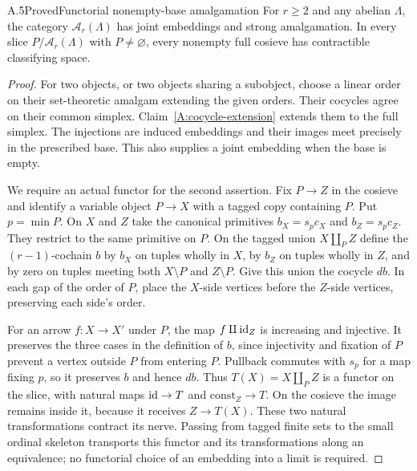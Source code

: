 \begin{claim}{A.5}{Proved}{Functorial nonempty-base amalgamation}\label{A:cocycle-amalgam}
For $r\geq2$ and any abelian $\Lambda$, the category $\mathcal A_r(\Lambda)$ has joint embeddings and strong amalgamation. In every slice $P/\mathcal A_r(\Lambda)$ with $P\ne\varnothing$, every nonempty full cosieve has contractible classifying space.
\end{claim}
\begin{proof}
For two objects, or two objects sharing a subobject, choose a linear order on their set-theoretic amalgam extending the given orders. Their cocycles agree on their common simplex. Claim~\ref{A:cocycle-extension} extends them to the full simplex. The injections are induced embeddings and their images meet precisely in the prescribed base. This also supplies a joint embedding when the base is empty.

We require an actual functor for the second assertion. Fix $P\to Z$ in the cosieve and identify a variable object $P\to X$ with a tagged copy containing $P$. Put $p=\min P$. On $X$ and $Z$ take the canonical primitives $b_X=s_pc_X$ and $b_Z=s_pc_Z$. They restrict to the same primitive on $P$. On the tagged union $X\amalg_P Z$ define the $(r-1)$-cochain $b$ by $b_X$ on tuples wholly in $X$, by $b_Z$ on tuples wholly in $Z$, and by zero on tuples meeting both $X\setminus P$ and $Z\setminus P$. Give this union the cocycle $db$. In each gap of the order of $P$, place the $X$-side vertices before the $Z$-side vertices, preserving each side's order.

For an arrow $f:X\to X'$ under $P$, the map $f\amalg\mathrm{id}_Z$ is increasing and injective. It preserves the three cases in the definition of $b$, since injectivity and fixation of $P$ prevent a vertex outside $P$ from entering $P$. Pullback commutes with $s_p$ for a map fixing $p$, so it preserves $b$ and hence $db$. Thus $T(X)=X\amalg_P Z$ is a functor on the slice, with natural maps $\mathrm{id}\to T$ and $\mathrm{const}_Z\to T$. On the cosieve the image remains inside it, because it receives $Z\to T(X)$. These two natural transformations contract its nerve. Passing from tagged finite sets to the small ordinal skeleton transports this functor and its transformations along an equivalence; no functorial choice of an embedding into a limit is required.
\end{proof}

